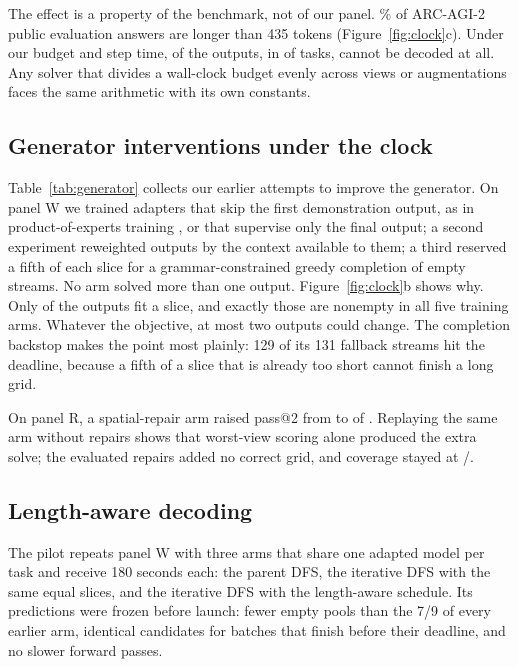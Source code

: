 \documentclass[10pt,twocolumn]{article}
\theoremstyle{plain}\newtheorem{proposition}{Proposition}
\theoremstyle{definition}\newtheorem{corollary}{Corollary}
\begin{document}
The effect is a property of the benchmark, not of our panel. \EvalOverPct\% of ARC-AGI-2 public evaluation answers are longer than 435 tokens (Figure~\ref{fig:clock}c). Under our budget and step time, \EvalUnreach{} of the \EvalOutputs{} outputs, in \EvalTasksUnreach{} of \EvalTasks{} tasks, cannot be decoded at all. Any solver that divides a wall-clock budget evenly across views or augmentations faces the same arithmetic with its own constants.

\subsection{Generator interventions under the clock}\label{sec:generator}

Table~\ref{tab:generator} collects our earlier attempts to improve the generator. On panel W we trained adapters that skip the first demonstration output, as in product-of-experts training \citep{franzen2025}, or that supervise only the final output; a second experiment reweighted outputs by the context available to them; a third reserved a fifth of each slice for a grammar-constrained greedy completion of empty streams. No arm solved more than one output. Figure~\ref{fig:clock}b shows why. Only \TrainReach{} of the \TrainN{} outputs fit a slice, and exactly those are nonempty in all five training arms. Whatever the objective, at most two outputs could change. The completion backstop makes the point most plainly: 129 of its 131 fallback streams hit the deadline, because a fifth of a slice that is already too short cannot finish a long grid.

On panel R, a spatial-repair arm raised pass@2 from \SFourBase{} to \SFourRepair{} of \SFourN. Replaying the same arm without repairs shows that worst-view scoring alone produced the extra solve; the \SFourRepairs{} evaluated repairs added no correct grid, and coverage stayed at \SFourOracle/\SFourN.

\subsection{Length-aware decoding}\label{sec:pilot}
The pilot repeats panel W with three arms that share one adapted model per task and receive 180 seconds each: the parent DFS, the iterative DFS with the same equal slices, and the iterative DFS with the length-aware schedule. Its predictions were frozen before launch: fewer empty pools than the 7/9 of every earlier arm, identical candidates for batches that finish before their deadline, and no slower forward passes.
\end{document}

